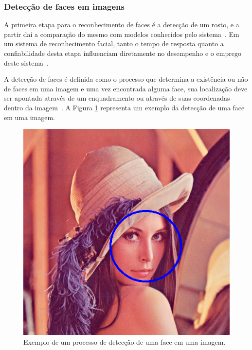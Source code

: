 
\subsubsection{Detecção de faces em imagens}
\label{ref:viola-jones}
	
	A primeira etapa para o reconhecimento de faces é a detecção de um rosto, e a
	partir daí a comparação do mesmo com modelos conhecidos pelo sistema~\cite{hong,
	oliveira}. Em um sistema de reconhecimento facial, tanto o tempo de resposta
	quanto a confiabilidade desta etapa influenciam diretamente no desempenho e o
	emprego deste sistema~\cite{oliveira}.
	
	A detecção de faces é definida como o processo que determina a existência ou não
	de faces em uma imagem e uma vez encontrada alguma face, sua localização deve
	ser apontada através de um enquadramento ou através de suas coordenadas dentro
	da imagem~\cite{oliveira}. A Figura \ref{enquadramentoRosto} representa um
	exemplo da detecção de uma face em uma imagem.

	\begin{figure}[H]
		\begin{center}
			\includegraphics[scale=0.3]{figuras/2.FundamentacaoTeorica/enquadramentoRosto.png}
		\end{center}
		\caption{Exemplo de um processo de detecção de uma face em uma imagem.}
		\label{enquadramentoRosto}
	\end{figure}

